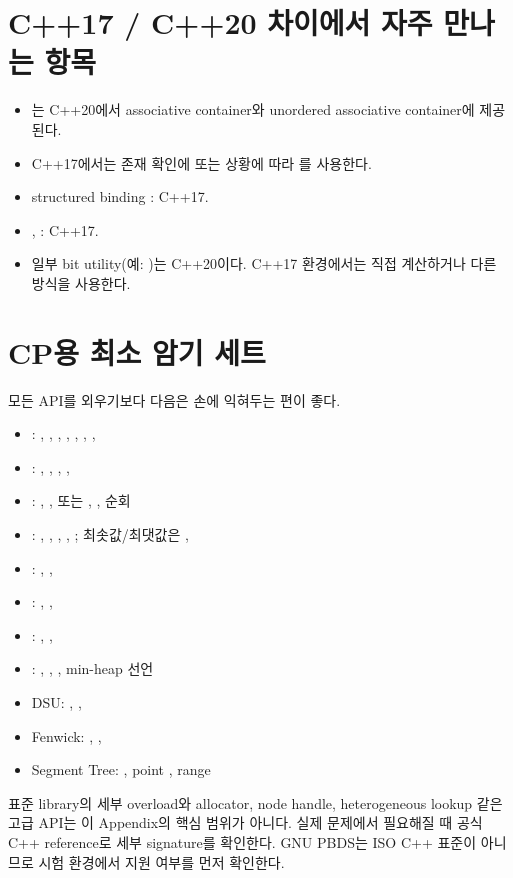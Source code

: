 \section{C++17 / C++20 차이에서 자주 만나는 항목}
\begin{itemize}
  \item {}는 C++20에서 associative container와 unordered associative container에 제공된다.
  \item C++17에서는 존재 확인에  또는 상황에 따라 를 사용한다.
  \item structured binding : C++17.
  \item {}, : C++17.
  \item 일부 bit utility(예: )는 C++20이다. C++17 환경에서는 직접 계산하거나 다른 방식을 사용한다.
\end{itemize}

\section{CP용 최소 암기 세트}
모든 API를 외우기보다 다음은 손에 익혀두는 편이 좋다.
\begin{itemize}
  \item {}: , , , , , , , 
  \item {}: , , , , 
  \item {}: , ,  또는 , , 순회
  \item {}: , , , , ; 최솟값/최댓값은 , 
  \item {}: , , 
  \item {}: , , 
  \item {}: , , 
  \item {}: , , , min-heap 선언
  \item DSU: , , 
  \item Fenwick: , , 
  \item Segment Tree: , point , range 
\end{itemize}

\begin{notebox}[참고 범위]
표준 library의 세부 overload와 allocator, node handle, heterogeneous lookup 같은 고급 API는 이 Appendix의 핵심 범위가 아니다. 실제 문제에서 필요해질 때 공식 C++ reference로 세부 signature를 확인한다. GNU PBDS는 ISO C++ 표준이 아니므로 시험 환경에서 지원 여부를 먼저 확인한다.
\end{notebox}
